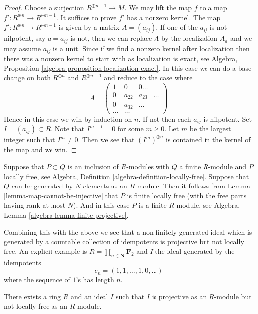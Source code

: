 \begin{proof}
Choose a surjection $R^{\oplus n - 1} \to M$.
We may lift the map $f$ to a map $f' : R^{\oplus n} \to R^{\oplus n - 1}$.
It suffices to prove $f'$ has a nonzero kernel.
The map $f' : R^{\oplus n} \to R^{\oplus n - 1}$ is given by a
matrix $A = (a_{ij})$. If one of the $a_{ij}$ is not nilpotent, say
$a = a_{ij}$ is not, then we can replace $A$ by the localization $A_a$
and we may assume $a_{ij}$ is a unit. Since if we find a nonzero kernel
after localization then there was a nonzero kernel to start with as
localization is exact, see
Algebra, Proposition \ref{algebra-proposition-localization-exact}.
In this case we can do a base change on both $R^{\oplus n}$
and $R^{\oplus n - 1}$ and reduce to the case where
$$
A =
\left(
\begin{matrix}
1 & 0 & 0 \ldots \\
0 & a_{22} & a_{23} & \ldots \\
0 & a_{32} & \ldots \\
\ldots & \ldots
\end{matrix}
\right)
$$
Hence in this case we win by induction on $n$. If not then each
$a_{ij}$ is nilpotent. Set $I = (a_{ij}) \subset R$. Note that
$I^{m + 1} = 0$ for some $m \geq 0$. Let $m$ be the largest integer
such that $I^m \not = 0$. Then we see that $(I^m)^{\oplus n}$ is
contained in the kernel of the map and we win.
\end{proof}

\noindent
Suppose that $P \subset Q$ is an inclusion of $R$-modules with $Q$ a
finite $R$-module and $P$ locally free, see
Algebra, Definition \ref{algebra-definition-locally-free}.
Suppose that $Q$ can be generated by $N$ elements as an $R$-module.
Then it follows from
Lemma \ref{lemma-map-cannot-be-injective}
that $P$ is finite locally free (with the free parts having rank
at most $N$). And in this case $P$ is a finite $R$-module, see
Algebra, Lemma \ref{algebra-lemma-finite-projective}.

\medskip\noindent
Combining this with the above we see that a non-finitely-generated
ideal which is generated by a countable collection of idempotents
is projective but not locally free. An explicit example is
$R = \prod_{n \in \mathbf{N}} \mathbf{F}_2$ and
$I$ the ideal generated by the idempotents
$$
e_n = (1, 1, \ldots, 1, 0, \ldots )
$$
where the sequence of $1$'s has length $n$.

\begin{lemma}
\label{lemma-ideal-projective-not-locally-free}
There exists a ring $R$ and an ideal $I$ such that $I$ is projective as
an $R$-module but not locally free as an $R$-module.
\end{lemma}

